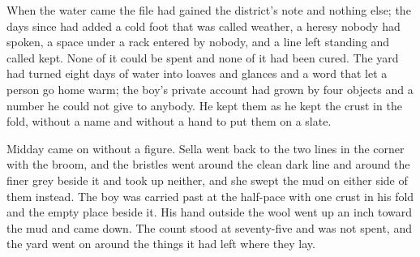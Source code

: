 When the water came the file had gained the district's note and nothing else; the days since had added a cold foot that was called weather, a heresy nobody had spoken, a space under a rack entered by nobody, and a line left standing and called kept. None of it could be spent and none of it had been cured. The yard had turned eight days of water into loaves and glances and a word that let a person go home warm; the boy's private account had grown by four objects and a number he could not give to anybody. He kept them as he kept the crust in the fold, without a name and without a hand to put them on a slate.

Midday came on without a figure. Sella went back to the two lines in the corner with the broom, and the bristles went around the clean dark line and around the finer grey beside it and took up neither, and she swept the mud on either side of them instead. The boy was carried past at the half-pace with one crust in his fold and the empty place beside it. His hand outside the wool went up an inch toward the mud and came down. The count stood at seventy-five and was not spent, and the yard went on around the things it had left where they lay.
